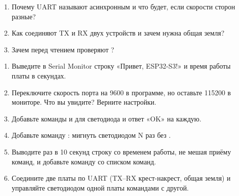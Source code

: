 \begin{selfcheck}
\begin{enumerate}
  \item Почему UART называют асинхронным и что будет, если скорости сторон разные?
  \item Как соединяют TX и RX двух устройств и зачем нужна общая земля?
  \item Зачем перед чтением проверяют ?
\end{enumerate}
\end{selfcheck}

\begin{tasks}
\begin{enumerate}
\item {} Выведите в Serial Monitor строку «Привет, ESP32-S3!» и время работы платы в секундах.
\item {} Переключите скорость порта на 9600 в программе, но оставьте 115200 в мониторе. Что вы увидите? Верните настройки.
\item {} Добавьте команды  и  для светодиода и ответ «OK» на каждую.
\item {} Добавьте команду : мигнуть светодиодом N раз без .
\item {} Выводите раз в 10 секунд строку со временем работы, не мешая приёму команд, и добавьте команду  со списком команд.
\item {} Соедините две платы по UART (TX--RX крест-накрест, общая земля) и управляйте светодиодом одной платы командами с другой.
\end{enumerate}
\end{tasks}
